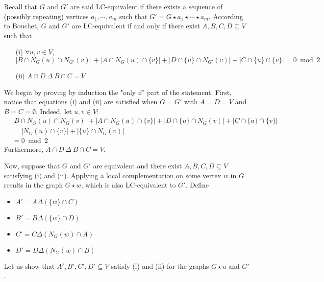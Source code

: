 \documentclass[a4paper,UKenglish,cleveref,autoref,thm-restate]{arxiv}
\begin{document}
Recall that $G$ and $G'$ are said LC-equivalent if there exists a sequence of (possibly repeating) vertices $a_1, \cdots, a_m$ such that $G' = G \star a_1 \star \cdots \star a_m$.
According to Bouchet, $G$ and $G'$ are LC-equivalent if and only if there exist $A,B,C,D\subseteq V$ such that
\begin{itemize}
\item[(i)] $\forall u,v \in V$,\\
$|B\cap N_G(u)\cap N_{G'}(v)| + |A\cap N_G(u)\cap \{v\}| +  |D\cap \{u\}\cap N_{G'}(v)| + |C\cap \{u\}\cap \{v\}| = 0\bmod 2$
\item[(ii)]
$A\cap D~\Delta~ B\cap C = V$
\end{itemize}

We begin by proving by induction the "only if" part of the statement. First, notice that equations (i) and (ii) are satisfied when $G = G'$ with $A = D = V$ and $B = C =  \emptyset$. Indeed, let $u,v \in V$:
\begin{align*}
    & |B\cap N_G(u)\cap N_{G}(v)| + |A\cap N_G(u)\cap \{v\}| +  |D\cap \{u\}\cap N_{G}(v)| + |C\cap \{u\}\cap \{v\}|\\
    &= |N_G(u)\cap \{v\}| +  |\{u\}\cap N_{G}(v)|\\
    &= 0 \bmod 2
\end{align*}
Furthermore, $A\cap D~\Delta~ B\cap C = V$.

Now, suppose that $G$ and $G'$ are equivalent and there exist $A,B,C,D\subseteq V$  satisfying (i) and (ii). Applying a local complementation on some vertex $w$ in $G$ results in the graph $G \star w$, which is also LC-equivalent to $G'$. Define 
\begin{itemize}
    \item $A' = A \Delta ( \{w\}\cap C)$
    \item $B' = B \Delta ( \{w\}\cap D)$
    \item $C' = C \Delta ( N_{G}(w)\cap A)$
    \item $D' = D \Delta ( N_{G}(w)\cap B)$
\end{itemize}
Let us show that $A',B',C',D'\subseteq V$  satisfy (i) and (ii) for the graphs $G \star u$ and $G'$.

\end{document}
